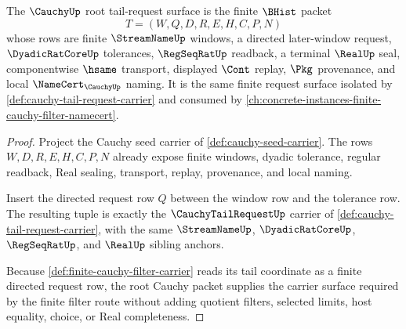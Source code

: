\begin{theorem}
\label{thm:cauchy-tail-request-carrier}
The $\CauchyUp$ root tail-request surface is the finite $\BHist$ packet
$$
T=(W,Q,D,R,E,H,C,P,N)
$$
whose rows are finite $\StreamNameUp$ windows, a directed later-window request, $\DyadicRatCoreUp$ tolerances, $\RegSeqRatUp$ readback, a terminal $\RealUp$ seal, componentwise $\hsame$ transport, displayed $\Cont$ replay, $\Pkg$ provenance, and local $\NameCert_{\CauchyUp}$ naming. It is the same finite request surface isolated by \autoref{def:cauchy-tail-request-carrier} and consumed by \autoref{ch:concrete-instances-finite-cauchy-filter-namecert}.
\end{theorem}
\begin{proof}
Project the Cauchy seed carrier of \autoref{def:cauchy-seed-carrier}. The rows $W,D,R,E,H,C,P,N$ already expose finite windows, dyadic tolerance, regular readback, Real sealing, transport, replay, provenance, and local naming.

Insert the directed request row $Q$ between the window row and the tolerance row. The resulting tuple is exactly the $\CauchyTailRequestUp$ carrier of \autoref{def:cauchy-tail-request-carrier}, with the same $\StreamNameUp$, $\DyadicRatCoreUp$, $\RegSeqRatUp$, and $\RealUp$ sibling anchors.

Because \autoref{def:finite-cauchy-filter-carrier} reads its tail coordinate as a finite directed request row, the root Cauchy packet supplies the carrier surface required by the finite filter route without adding quotient filters, selected limits, host equality, choice, or Real completeness.
\end{proof}

